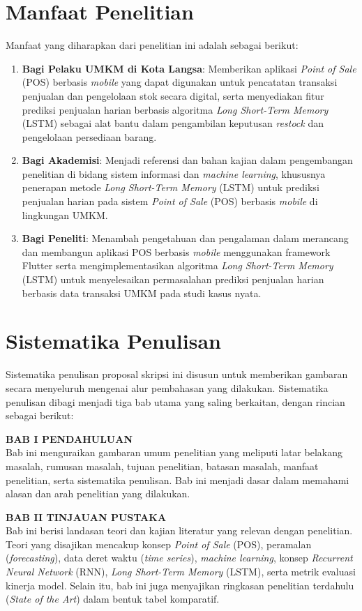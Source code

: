 \section{Manfaat Penelitian}
Manfaat yang diharapkan dari penelitian ini adalah sebagai berikut:
\begin{enumerate}
    \item \textbf{Bagi Pelaku UMKM di Kota Langsa}: Memberikan aplikasi \textit{Point of Sale} (POS) berbasis \textit{mobile} yang dapat digunakan untuk pencatatan transaksi penjualan dan pengelolaan stok secara digital, serta menyediakan fitur prediksi penjualan harian berbasis algoritma \textit{Long Short-Term Memory} (LSTM) sebagai alat bantu dalam pengambilan keputusan \textit{restock} dan pengelolaan persediaan barang.
    \item \textbf{Bagi Akademisi}: Menjadi referensi dan bahan kajian dalam pengembangan penelitian di bidang sistem informasi dan \textit{machine learning}, khususnya penerapan metode \textit{Long Short-Term Memory} (LSTM) untuk prediksi penjualan harian pada sistem \textit{Point of Sale} (POS) berbasis \textit{mobile} di lingkungan UMKM.
    \item \textbf{Bagi Peneliti}: Menambah pengetahuan dan pengalaman dalam merancang dan membangun aplikasi POS berbasis \textit{mobile} menggunakan framework Flutter serta mengimplementasikan algoritma \textit{Long Short-Term Memory} (LSTM) untuk menyelesaikan permasalahan prediksi penjualan harian berbasis data transaksi UMKM pada studi kasus nyata.
\end{enumerate}

\section{Sistematika Penulisan}
Sistematika penulisan proposal skripsi ini disusun untuk memberikan gambaran secara menyeluruh mengenai alur pembahasan yang dilakukan. Sistematika penulisan dibagi menjadi tiga bab utama yang saling berkaitan, dengan rincian sebagai berikut:

\noindent\textbf{BAB I PENDAHULUAN}\\
Bab ini menguraikan gambaran umum penelitian yang meliputi latar belakang masalah, rumusan masalah, tujuan penelitian, batasan masalah, manfaat penelitian, serta sistematika penulisan. Bab ini menjadi dasar dalam memahami alasan dan arah penelitian yang dilakukan.

\noindent\textbf{BAB II TINJAUAN PUSTAKA}\\
Bab ini berisi landasan teori dan kajian literatur yang relevan dengan penelitian. Teori yang disajikan mencakup konsep \textit{Point of Sale} (POS), peramalan (\textit{forecasting}), data deret waktu (\textit{time series}), \textit{machine learning}, konsep \textit{Recurrent Neural Network} (RNN), \textit{Long Short-Term Memory} (LSTM), serta metrik evaluasi kinerja model. Selain itu, bab ini juga menyajikan ringkasan penelitian terdahulu (\textit{State of the Art}) dalam bentuk tabel komparatif.

